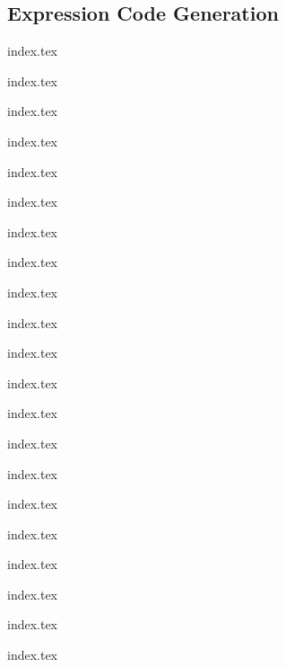 
\subsection{Expression Code Generation}
{
	\lipsum[1]
	
	{index.tex}
	
	{index.tex}
	
	{index.tex}
	
	{index.tex}
	
	{index.tex}
	
	{index.tex}
	
	{index.tex}
	
	{index.tex}
	
	{index.tex}
	
	{index.tex}
	
	{index.tex}
	
	{index.tex}
	
	{index.tex}
	
	{index.tex}
	
	{index.tex}
	
	{index.tex}
	
	{index.tex}
	
	{index.tex}
	
	{index.tex}
	
	{index.tex}
	
	{index.tex}
}
